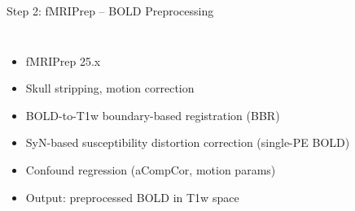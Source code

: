 \begin{frame}{Step 2: fMRIPrep -- BOLD Preprocessing}

  \begin{columns}[T]
    \begin{itemize}
      \item fMRIPrep 25.x \cite{Esteban2019}
      \item Skull stripping, motion correction
      \item BOLD-to-T1w boundary-based registration (BBR)
      \item SyN-based susceptibility distortion correction
        (single-PE BOLD)
      \item Confound regression (aCompCor, motion params)
      \item Output: preprocessed BOLD in T1w space
    \end{itemize}

    \begin{center}
    \end{center}
  \end{columns}

\end{frame}

